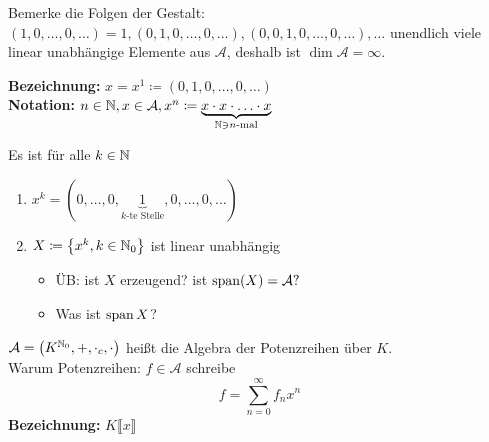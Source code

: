 Bemerke die Folgen der Gestalt:
$ (1, 0, \dotsc, 0, \dotsc) = 1, (0, 1, 0, \dotsc, 0, \dotsc) , (0, 0, 1, 0, \dotsc, 0, \dotsc), \dotsc $ unendlich viele linear unabhängige Elemente aus $ \mathcal{A}  $, deshalb ist $ \dim \mathcal{A} = \infty $.

\textbf{Bezeichnung:} $ x = x^1 \coloneqq (0, 1, 0, \dotsc, 0, \dotsc) $\\
\textbf{Notation:} $ n \in \mathbb{N} , x \in \mathcal{A} , x^n \coloneqq \underbrace{x \cdot x \cdot \dotsc \cdot x}_{\mathbb{N} \ni n \text{-mal} } $

\begin{subproposition}
	Es ist für alle $ k \in \mathbb{N}  $
	\begin{enumerate}[label=(\arabic*)]
		\item $ x^k = (0, \dotsc, 0, \underbrace{1}_{k \text{-te Stelle} }, 0, \dotsc, 0, \dotsc) $ 
		\item $ X \coloneqq \left\{ x^k, k \in \mathbb{N} _0 \right\}  $ ist linear unabhängig
			{\color{gadse-red} 
			\begin{itemize}
				\item ÜB: ist $ X $ erzeugend? ist $ \operatorname{span}(X) = \mathcal{A} ? $
				\item Was ist $ \operatorname{span} X $?
			\end{itemize}
			}
	\end{enumerate}
\end{subproposition}

\begin{subdefinition}
	$ \mathcal{A} = \left( K^{\mathbb{N} _0} , + , \cdot _c , \cdot  \right)  $ heißt die Algebra der Potenzreihen über $ K $.\\
	Warum Potenzreihen:
	$ f \in \mathcal{A}  $ schreibe
	\[
		f = \sum_{n=0}^{\infty} f_n x^n
	\]
	\textbf{Bezeichnung:} $ K\llbracket x \rrbracket $
\end{subdefinition}

